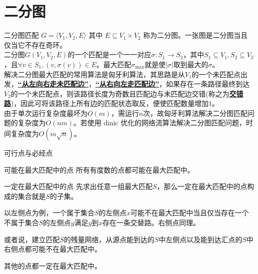 \documentclass{beamer}
\def\obj#1{\textbf{\uline{#1}}}
\begin{document}
\section{二分图}
\begin{frame}{二分图匹配}
	$G = \langle V_1, V_2, E\rangle$ 其中 $E \subseteq V_1 \times V_2$ 称为二分图。一张图是二分图当且仅当它不存在奇环。\pause\\
	
	二分图$G(V_1, V_2, E)$的一个匹配是一个一一对应$\sigma: S_1 \to S_2$，其中$S_1 \subseteq V_1, S_2 \subseteq V_2$，且$\forall v \in S_1, (v, \sigma(v)) \in E$。最大匹配$\sigma_{\max}$就是使$|\sigma|$取到最大的$\sigma$。\pause\\
	
	解决二分图最大匹配的常用算法是匈牙利算法，其思路是从$V_1$的一个未匹配点出发，\obj{“从左向右走未匹配边”}，\obj{“从右向左走匹配边”}，如果存在一条路径最终到达$V_2$的一个未匹配点，则该路径长度为奇数且匹配边与未匹配边交错(称之为\obj{交错路})，因此可将该路径上所有边的匹配状态取反，便使匹配数量增加$1$。\\
	
	由于单次运行复杂度最坏为$O(m)$，需运行$n$次，故匈牙利算法解决二分图匹配问题的复杂度为$O(nm)$。若使用 dinic 优化的网络流算法解决二分图匹配问题，时间复杂度为$O(m\sqrt n)$。
	
\end{frame}

\begin{frame}{可行点与必经点}
	\begin{block}{可能在最大匹配中的点}
		\pause
		所有有度数的点都可能在最大匹配中。
	\end{block}
	\pause
	\begin{block}{一定在最大匹配中的点}
		\pause
		先求出任意一组最大匹配$S$，那么一定在最大匹配中的点构成的集合就是$S$的子集。
		
		以左侧点为例，一个属于集合$S$的左侧点$x$可能不在最大匹配中当且仅当存在一个不属于集合$S$的左侧点$y$满足$y$到$x$存在一条交替路。右侧点同理。
		
		或者说，建立匹配$S$的残量网络，从源点能到达的$S$中左侧点以及能到达汇点的$S$中右侧点都可能不在最大匹配中。
		
		其他的点都一定在最大匹配中。
	\end{block}
\end{frame}
\end{document}
